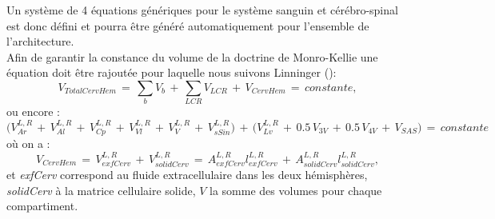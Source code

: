Un système de 4 équations génériques pour le système sanguin et cérébro-spinal est donc
défini et pourra être généré automatiquement pour l’ensemble de l’architecture.\\
Afin de garantir la constance du volume de la doctrine de Monro-Kellie une équation doit être
rajoutée pour laquelle nous suivons Linninger (\cite{Linninger2009}):
\begin{equation}
V_{TotalCervHem}\,=\,\sum_b V_b\,+\,\sum_{LCR} V_{LCR}\,+\, V_{CervHem}\,=\,constante,
\end{equation}
ou encore :
\begin{equation}
\bigl(V_{Ar}^{L,R}\,+\,V_{Al}^{L,R}\,+\,V_{Cp}^{L,R}\,+\,V_{Vl}^{L,R}\,+\,V_{V}^{L,R}\,+\,V_{sSin}^{L,R}\bigr)\,+\,\bigl(V_{Lv}^{L,R}\,+\,0.5\,V_{3V}\,+\,0.5\,V_{4V}\,+\,V_{SAS}\bigr)\,=\,constante
\end{equation}
où on a :
\begin{equation}
V_{CervHem}\,=\,V_{exfCerv}^{L,R}\,+\,V_{solidCerv}^{L,R}\,=\,A_{exfCerv}^{L,R} l_{exfCerv}^{L,R}\,+\,A_{solidCerv}^{L,R} l_{solidCerv}^{L,R},
\end{equation}
et {\em exfCerv} correspond au fluide extracellulaire dans les deux hémisphères, {\em solidCerv} à la matrice
cellulaire solide, $V$ la somme des volumes pour chaque compartiment.\\
